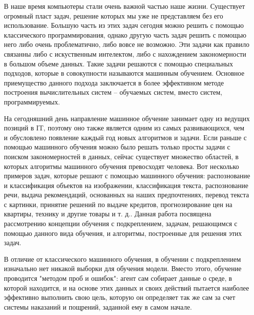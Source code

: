 \documentclass[bachelor, och, coursework]{shiza}
\begin{document}

\tableofcontents

\intro

В наше время компьютеры стали очень важной частью наше жизни. Существует огромный пласт задач, решение
которых мы уже не представляем без его использование. Большую часть из этих задач сегодня можно решить с помощью классического
программирования, однако другую часть задач решить с помощью него либо очень проблематично, либо вовсе не возможно. Эти 
задачи как правило связанны либо с искуственным интелектом, либо с нахождением закономерности в большом объеме данных.
Такие задачи решаются с помощью специальных подходов, которые в совокупности называются машинным обучением. Основное
приемущество данного подхода заключается в более эффективном методе построения вычислительных систем – обучаемых систем,
вместо систем, программируемых. 

На сегодняшний день направление машинное обучение занимает одну из ведущих позиций в IT, поэтому оно также является одним
из самых развивающихся, чем и обусловлено появление каждый год новых алгоритмов и задачи. Если раньше с помощью машинного
обучения можно было решать только просты задачи с поиском закономерностей в данных, сейчас существует множество областей,
в которых алгоритмы машинного обучения превосходят человека. Вот несколько примеров задач, которые решают с помощью
машинного обучения: распознование и классификация объектов на изображении, классификация текста, распознование речи, 
выдача рекомендаций, основанных на наших предпочтениях, перевод текста с картинки, принятие решений по выдаче кредитов,
прогнозирование цен на квартиры, технику и другие товары и т. д.. Данная работа посвящена рассмотрению концепции обучения
с подкреплением, задачам, решающимся с помощью данного вида обучения, и алгоритмы, построенные для решения этих задач.

В отличие от классического машинного обучения, в обучении с подкреплением изначально нет никакой выборки для обучения модели.
Вместо этого, обучение проводится "методом проб и ошибок": агент сам собирает данные о среде, в которой находится, и на 
основе этих данных и своих действий пытается наиболее эффективно выполнить свою цель, которую он определяет так же сам за
счет системы наказаний и пощрений, заданной ему в самом начале.
\end{document}
